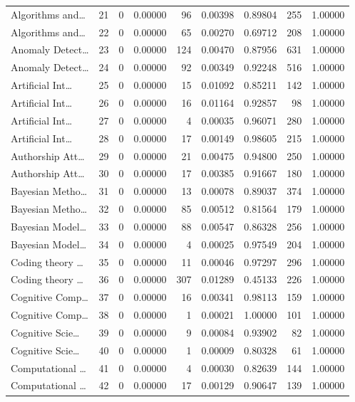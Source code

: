 \begin{table}
\begin{tabular}{lrrrrrrrr}
Algorithms and… & 21 & 0 & 0.00000 & 96 & 0.00398 & 0.89804 & 255 & 1.00000 \\
Algorithms and… & 22 & 0 & 0.00000 & 65 & 0.00270 & 0.69712 & 208 & 1.00000 \\
Anomaly Detect… & 23 & 0 & 0.00000 & 124 & 0.00470 & 0.87956 & 631 & 1.00000 \\
Anomaly Detect… & 24 & 0 & 0.00000 & 92 & 0.00349 & 0.92248 & 516 & 1.00000 \\
Artificial Int… & 25 & 0 & 0.00000 & 15 & 0.01092 & 0.85211 & 142 & 1.00000 \\
Artificial Int… & 26 & 0 & 0.00000 & 16 & 0.01164 & 0.92857 & 98 & 1.00000 \\
Artificial Int… & 27 & 0 & 0.00000 & 4 & 0.00035 & 0.96071 & 280 & 1.00000 \\
Artificial Int… & 28 & 0 & 0.00000 & 17 & 0.00149 & 0.98605 & 215 & 1.00000 \\
Authorship Att… & 29 & 0 & 0.00000 & 21 & 0.00475 & 0.94800 & 250 & 1.00000 \\
Authorship Att… & 30 & 0 & 0.00000 & 17 & 0.00385 & 0.91667 & 180 & 1.00000 \\
Bayesian Metho… & 31 & 0 & 0.00000 & 13 & 0.00078 & 0.89037 & 374 & 1.00000 \\
Bayesian Metho… & 32 & 0 & 0.00000 & 85 & 0.00512 & 0.81564 & 179 & 1.00000 \\
Bayesian Model… & 33 & 0 & 0.00000 & 88 & 0.00547 & 0.86328 & 256 & 1.00000 \\
Bayesian Model… & 34 & 0 & 0.00000 & 4 & 0.00025 & 0.97549 & 204 & 1.00000 \\
Coding theory … & 35 & 0 & 0.00000 & 11 & 0.00046 & 0.97297 & 296 & 1.00000 \\
Coding theory … & 36 & 0 & 0.00000 & 307 & 0.01289 & 0.45133 & 226 & 1.00000 \\
Cognitive Comp… & 37 & 0 & 0.00000 & 16 & 0.00341 & 0.98113 & 159 & 1.00000 \\
Cognitive Comp… & 38 & 0 & 0.00000 & 1 & 0.00021 & 1.00000 & 101 & 1.00000 \\
Cognitive Scie… & 39 & 0 & 0.00000 & 9 & 0.00084 & 0.93902 & 82 & 1.00000 \\
Cognitive Scie… & 40 & 0 & 0.00000 & 1 & 0.00009 & 0.80328 & 61 & 1.00000 \\
Computational … & 41 & 0 & 0.00000 & 4 & 0.00030 & 0.82639 & 144 & 1.00000 \\
Computational … & 42 & 0 & 0.00000 & 17 & 0.00129 & 0.90647 & 139 & 1.00000 \\

\end{tabular}
\end{table}
